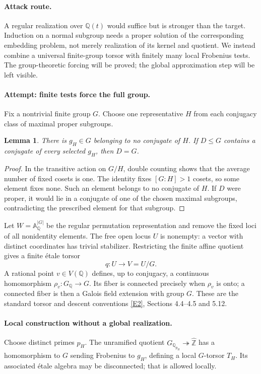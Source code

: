 \documentclass[11pt,a4paper]{article}
\newcommand{\Z}{\mathbb{Z}}
\newcommand{\Q}{\mathbb{Q}}
\newcommand{\A}{\mathbb{A}}
\newcommand{\eref}[2]{\hyperlink{extra:#1:#2}{[E#2]}}
\newtheorem{notebooklemma}{Lemma}[section]
\numberwithin{equation}{section}
\begin{document}
\paragraph{Attack route.}
A regular realization over $\Q(t)$ would suffice but is stronger than the target. Induction on a normal subgroup needs a proper solution of the corresponding embedding problem, not merely realization of its kernel and quotient. We instead combine a universal finite-group torsor with finitely many local Frobenius tests. The group-theoretic forcing will be proved; the global approximation step will be left visible.

\paragraph{Attempt: finite tests force the full group.}
Fix a nontrivial finite group $G$. Choose one representative $H$ from each conjugacy class of maximal proper subgroups.
\begin{notebooklemma}\label{r61:derangement}
There is $g_H\in G$ belonging to no conjugate of $H$. If $D\le G$ contains a conjugate of every selected $g_H$, then $D=G$.
\end{notebooklemma}
\begin{proof}
In the transitive action on $G/H$, double counting shows that the average number of fixed cosets is one. The identity fixes $[G:H]>1$ cosets, so some element fixes none. Such an element belongs to no conjugate of $H$. If $D$ were proper, it would lie in a conjugate of one of the chosen maximal subgroups, contradicting the prescribed element for that subgroup.
\end{proof}

Let $W=\A^{|G|}_{\Q}$ be the regular permutation representation and remove the fixed loci of all nonidentity elements. The free open locus $U$ is nonempty: a vector with distinct coordinates has trivial stabilizer. Restricting the finite affine quotient gives a finite étale torsor
\[
 q:U\longrightarrow V=U/G.
\]
A rational point $v\in V(\Q)$ defines, up to conjugacy, a continuous homomorphism $\rho_v:G_{\Q}\to G$. Its fiber is connected precisely when $\rho_v$ is onto; a connected fiber is then a Galois field extension with group $G$. These are the standard torsor and descent conventions \eref{statement}{2}, Sections 4.4--4.5 and 5.12.

\paragraph{Local construction without a global realization.}
Choose distinct primes $p_H$. The unramified quotient $G_{\Q_{p_H}}\twoheadrightarrow\widehat{\Z}$ has a homomorphism to $G$ sending Frobenius to $g_H$, defining a local $G$-torsor $T_H$. Its associated étale algebra may be disconnected; that is allowed locally.
\end{document}
